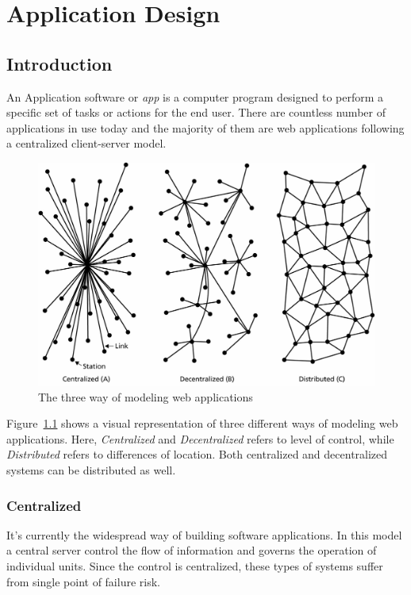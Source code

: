\chapter{Application Design}\label{chapter::decentralizedapps}

\section{Introduction}
	An Application software or \textit{app} is a computer program designed to perform a specific set of tasks or actions for the end user. There are countless number of applications in use today and the majority of them are web applications following a centralized client-server model\cite{raval2016decentralized}.
	
	\begin{figure}[h]
		\includegraphics[width=\linewidth]{figures/network-models}
		\caption{\label{fig:applications} The three way of modeling web applications}
	\end{figure}
	
	Figure~\ref{fig:applications} shows a visual representation of three different ways of modeling web applications\cite{baran1964distributed}. Here, \textit{Centralized} and \textit{Decentralized} refers to level of control, while \textit{Distributed} refers to differences of location. Both centralized and decentralized systems can be distributed as well.
	
	\subsection{Centralized}
	It's currently the widespread way of building software applications. In this model a central server control the flow of information and governs the operation of individual units. Since the control is centralized, these types of systems suffer from single point of failure risk.
	
